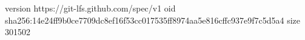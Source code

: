 version https://git-lfs.github.com/spec/v1
oid sha256:14e24ff9b0ce7709dc8ef16f53cc017535ff8974aa5e816cffc937e9f7c5d5a4
size 301502
